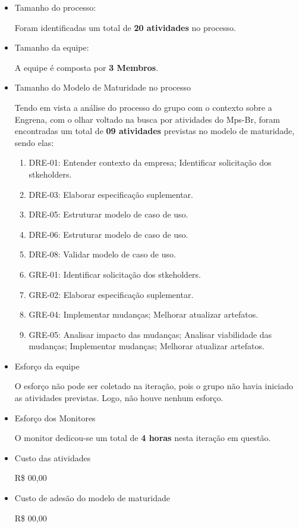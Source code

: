 \begin{itemize}
\item Tamanho do processo:

Foram identificadas um total de \textbf{20 atividades} no processo.

\item Tamanho da equipe:

A equipe é composta por \textbf{3 Membros}.

\item Tamanho do Modelo de Maturidade no processo

Tendo em vista a análise do processo do grupo com o contexto sobre a Engrena, com o olhar voltado na busca por atividades do Mps-Br, foram encontradas um total de \textbf{09 atividades} previstas no modelo de maturidade, sendo elas:

    \begin{enumerate}
    \item DRE-01: Entender contexto da empresa; Identificar solicitação dos stkeholders.
    \item DRE-03: Elaborar especificação suplementar.
    \item DRE-05: Estruturar modelo de caso de uso.
    \item DRE-06: Estruturar modelo de caso de uso.
    \item DRE-08: Validar modelo de caso de uso.
    \item GRE-01: Identificar solicitação dos stkeholders.
    \item GRE-02: Elaborar especificação suplementar.
    \item GRE-04: Implementar mudanças; Melhorar atualizar artefatos.
    \item GRE-05: Analisar impacto das mudanças; Analisar viabilidade das mudanças; Implementar mudanças; Melhorar atualizar artefatos.
    \end{enumerate}

\item Esforço da equipe

O esforço não pode ser coletado na iteração, pois o grupo não havia iniciado as atividades previstas. Logo, não houve nenhum esforço.

\item Esforço dos Monitores

O monitor dedicou-se um total de \textbf{4 horas} nesta iteração em questão.

\item Custo das atividades

R\$ 00,00

\item Custo de adesão do modelo de maturidade

R\$ 00,00

\end{itemize}

